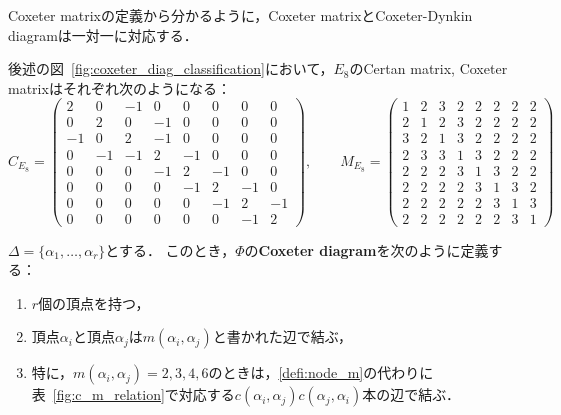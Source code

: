 Coxeter matrixの定義から分かるように，Coxeter matrixとCoxeter-Dynkin diagramは一対一に対応する．

\begin{example}
  後述の図~\ref{fig:coxeter_diag_classification}において，$E_8$のCertan matrix, Coxeter matrixはそれぞれ次のようになる：
  \begin{equation}
    C_{E_8} =
    \begin{pmatrix}
      2 & 0 & -1 & 0 & 0 & 0 & 0 & 0 \\
      0 & 2 & 0 & -1 & 0 & 0 & 0 & 0 \\
      -1 & 0 & 2 & -1 & 0 & 0 & 0 & 0 \\
      0 & -1 & -1 & 2 & -1 & 0 & 0 & 0 \\
      0 & 0 & 0 & -1 & 2 & -1 & 0 & 0 \\
      0 & 0 & 0 & 0 & -1 & 2 & -1 & 0 \\
      0 & 0 & 0 & 0 & 0 & -1 & 2 & -1 \\
      0 & 0 & 0 & 0 & 0 & 0 & -1 & 2
    \end{pmatrix},\qquad
    M_{E_8} =
    \begin{pmatrix}
      1 & 2 & 3 & 2 & 2 & 2 & 2 & 2 \\
      2 & 1 & 2 & 3 & 2 & 2 & 2 & 2 \\
      3 & 2 & 1 & 3 & 2 & 2 & 2 & 2 \\
      2 & 3 & 3 & 1 & 3 & 2 & 2 & 2 \\
      2 & 2 & 2 & 3 & 1 & 3 & 2 & 2 \\
      2 & 2 & 2 & 2 & 3 & 1 & 3 & 2 \\
      2 & 2 & 2 & 2 & 2 & 3 & 1 & 3 \\
      2 & 2 & 2 & 2 & 2 & 2 & 3 & 1
    \end{pmatrix}
  \end{equation}
\end{example}

\begin{definition}
  $\Delta = \{\alpha_1, \ldots, \alpha_r\}$とする．
  このとき，$\Phi$の\textbf{Coxeter diagram}を次のように定義する：
  \begin{enumerate}[label=(\roman*)]
    \item $r$個の頂点を持つ，
    \item 頂点$\alpha_i$と頂点$\alpha_j$は$m(\alpha_i, \alpha_j)$と書かれた辺で結ぶ，\label{defi:node_m}
    \item 特に，$m(\alpha_i, \alpha_j) = 2, 3, 4, 6$のときは，\ref{defi:node_m}の代わりに表~\ref{fig:c_m_relation}で対応する$c(\alpha_i, \alpha_j) c(\alpha_j, \alpha_i)$本の辺で結ぶ．
  \end{enumerate}
\end{definition}

